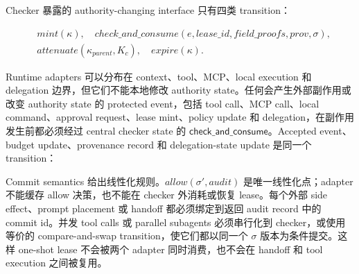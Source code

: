 \documentclass[UTF8,a4paper,11pt]{ctexart}
\begin{document}
Checker 暴露的 authority-changing interface 只有四类 transition：

\[
\begin{aligned}
&mint(\kappa), \quad check\_and\_consume(e,lease\_id,field\_proofs,prov,\sigma),\\
&attenuate(\kappa_{parent},K_c), \quad expire(\kappa).
\end{aligned}
\]

Runtime adapters 可以分布在 context、tool、MCP、local execution 和 delegation 边界，但它们不能本地修改 authority state。任何会产生外部副作用或改变 authority state 的 protected event，包括 tool call、MCP call、local command、approval request、lease mint、policy update 和 delegation，在副作用发生前都必须经过 central checker state 的 \(\mathsf{check\_and\_consume}\)。Accepted event、budget update、provenance record 和 delegation-state update 是同一个 transition：

Commit semantics 给出线性化规则。\(allow(\sigma',audit)\) 是唯一线性化点；adapter 不能缓存 allow 决策，也不能在 checker 外消耗或恢复 lease。每个外部 side effect、prompt placement 或 handoff 都必须绑定到返回 audit record 中的 commit id。并发 tool calls 或 parallel subagents 必须串行化到 checker，或使用等价的 compare-and-swap transition，使它们都以同一个 \(\sigma\) 版本为条件提交。这样 one-shot lease 不会被两个 adapter 同时消费，也不会在 handoff 和 tool execution 之间被复用。
\end{document}
